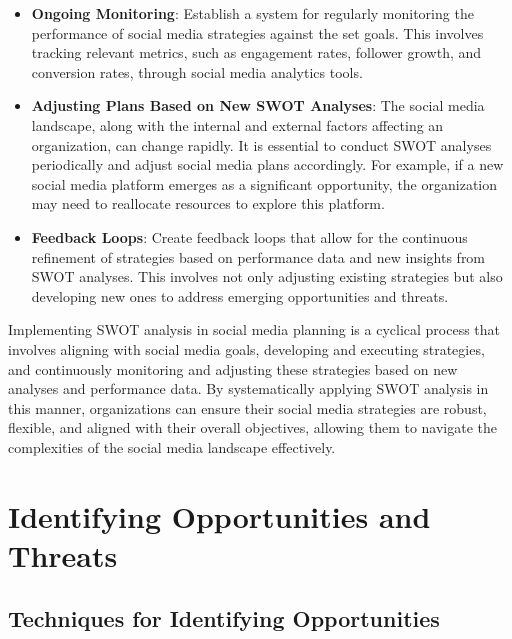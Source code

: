 \documentclass[
]{book}
\providecommand{\tightlist}{%
  \setlength{\itemsep}{0pt}\setlength{\parskip}{0pt}}
\begin{document}
\begin{itemize}
\tightlist
\item
  \textbf{Ongoing Monitoring}: Establish a system for regularly monitoring the performance of social media strategies against the set goals. This involves tracking relevant metrics, such as engagement rates, follower growth, and conversion rates, through social media analytics tools.
\item
  \textbf{Adjusting Plans Based on New SWOT Analyses}: The social media landscape, along with the internal and external factors affecting an organization, can change rapidly. It is essential to conduct SWOT analyses periodically and adjust social media plans accordingly. For example, if a new social media platform emerges as a significant opportunity, the organization may need to reallocate resources to explore this platform.
\item
  \textbf{Feedback Loops}: Create feedback loops that allow for the continuous refinement of strategies based on performance data and new insights from SWOT analyses. This involves not only adjusting existing strategies but also developing new ones to address emerging opportunities and threats.
\end{itemize}

Implementing SWOT analysis in social media planning is a cyclical process that involves aligning with social media goals, developing and executing strategies, and continuously monitoring and adjusting these strategies based on new analyses and performance data. By systematically applying SWOT analysis in this manner, organizations can ensure their social media strategies are robust, flexible, and aligned with their overall objectives, allowing them to navigate the complexities of the social media landscape effectively.

\hypertarget{identifying-opportunities-and-threats}{%
\section*{Identifying Opportunities and Threats}\label{identifying-opportunities-and-threats}}

\hypertarget{techniques-for-identifying-opportunities}{%
\subsection*{Techniques for Identifying Opportunities}\label{techniques-for-identifying-opportunities}}
\end{document}

